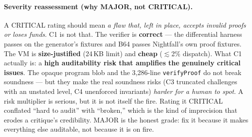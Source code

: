 \paragraph{Severity reassessment (why MAJOR, not CRITICAL).}
A CRITICAL rating should mean \emph{a flaw that, left in place,
accepts invalid proofs or loses funds}. C1 is not that. The
verifier is \textbf{correct} --- the differential harness passes
on the generator's fixtures and B64 passes Nightfall's own proof
fixtures. The VM is \textbf{size-justified} (24\,KB limit) and
\textbf{cheap} ($\lesssim$2\% dispatch). What C1 actually is: a
\textbf{high auditability risk that amplifies the genuinely
critical issues}. The opaque program blob and the 3{,}286-line
\texttt{verifyProof} do not break soundness --- but they make
the real soundness risks (C3 truncated challenges with an unstated level, C4
unenforced invariants) \emph{harder for a human to spot}. A risk
multiplier is serious, but it is not itself the fire. Rating it
CRITICAL conflated ``hard to audit'' with ``broken,'' which is
the kind of imprecision that erodes a critique's credibility.
MAJOR is the honest grade: fix it because it makes everything
else auditable, not because it is on fire.

